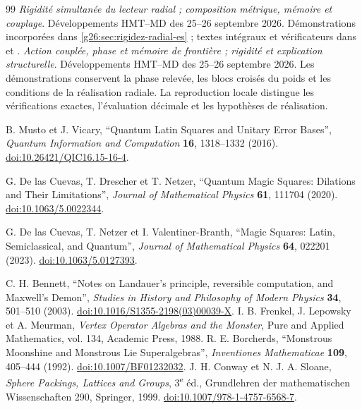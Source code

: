 \begin{thebibliography}{99}
 \emph{Rigidité simultanée du lecteur radial ;
composition métrique, mémoire et couplage}. Développements HMT--MD des
25--26 septembre 2026. Démonstrations incorporées dans
\ref{g26:sec:rigidez-radial-es} ; textes intégraux et vérificateurs dans
 et
.
 \emph{Action couplée, phase et mémoire de frontière ;
rigidité et explication structurelle}. Développements HMT--MD des
25--26 septembre 2026. Les démonstrations conservent la phase
relevée, les blocs croisés du poids et les conditions de la
réalisation radiale. La reproduction locale distingue les vérifications
exactes, l'évaluation décimale et les hypothèses de réalisation.
{}
 B. Musto et J. Vicary, ``Quantum Latin Squares and Unitary Error Bases'', \emph{Quantum Information and Computation} \textbf{16}, 1318--1332 (2016). \href{https://doi.org/10.26421/QIC16.15-16-4}{doi:10.26421/QIC16.15-16-4}.


 G. De las Cuevas, T. Drescher et T. Netzer, ``Quantum Magic Squares: Dilations and Their Limitations'', \emph{Journal of Mathematical Physics} \textbf{61}, 111704 (2020). \href{https://doi.org/10.1063/5.0022344}{doi:10.1063/5.0022344}.


 G. De las Cuevas, T. Netzer et I. Valentiner-Branth, ``Magic Squares: Latin, Semiclassical, and Quantum'', \emph{Journal of Mathematical Physics} \textbf{64}, 022201 (2023). \href{https://doi.org/10.1063/5.0127393}{doi:10.1063/5.0127393}.


 C. H. Bennett, ``Notes on Landauer's principle,
reversible computation, and Maxwell's Demon'', \emph{Studies in History
and Philosophy of Modern Physics} \textbf{34}, 501--510 (2003).
\href{https://doi.org/10.1016/S1355-2198(03)00039-X}{doi:10.1016/S1355-2198(03)00039-X}.
 I. B. Frenkel, J. Lepowsky et A. Meurman, \emph{Vertex Operator Algebras and the Monster}, Pure and Applied Mathematics, vol. 134, Academic Press, 1988.
 R. E. Borcherds, ``Monstrous Moonshine and Monstrous Lie Superalgebras'', \emph{Inventiones Mathematicae} \textbf{109}, 405--444 (1992). \href{https://doi.org/10.1007/BF01232032}{doi:10.1007/BF01232032}.
 J. H. Conway et N. J. A. Sloane, \emph{Sphere Packings, Lattices and Groups}, 3\textsuperscript{e} éd., Grundlehren der mathematischen Wissenschaften 290, Springer, 1999. \href{https://doi.org/10.1007/978-1-4757-6568-7}{doi:10.1007/978-1-4757-6568-7}.


\end{thebibliography}
